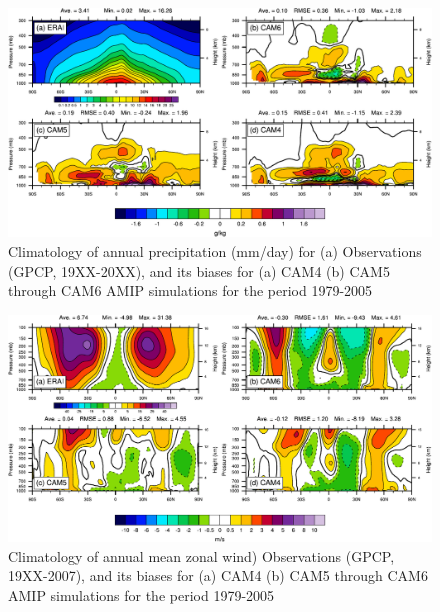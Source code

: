 \clearpage
\begin{figure}[t]
  \begin{center}
    \includegraphics[width=1.\textwidth,angle=0.]{./figs/f_MERRA_Q_latp_diff_ANN.pdf}
  \end{center}
  \caption{Climatology of annual precipitation (mm/day) for (a) Observations (GPCP, 19XX-20XX), and its biases for (a) CAM4 (b) CAM5  through CAM6 AMIP simulations for the period 1979-2005} 
\label{MERRA_Q_latp_diff_ANN}
\end{figure} 

\clearpage
\begin{figure}[t]
  \begin{center}
    \includegraphics[width=1.\textwidth,angle=0.]{./figs/f_U_2D_ANN_CAM456.pdf}
  \end{center}
  \caption{Climatology of annual mean zonal wind) Observations (GPCP, 19XX-2007), and its biases for (a) CAM4 (b) CAM5  through CAM6 AMIP simulations for the period 1979-2005} 
\label{f_U_2D_ANN_CAM456}
\end{figure} 




